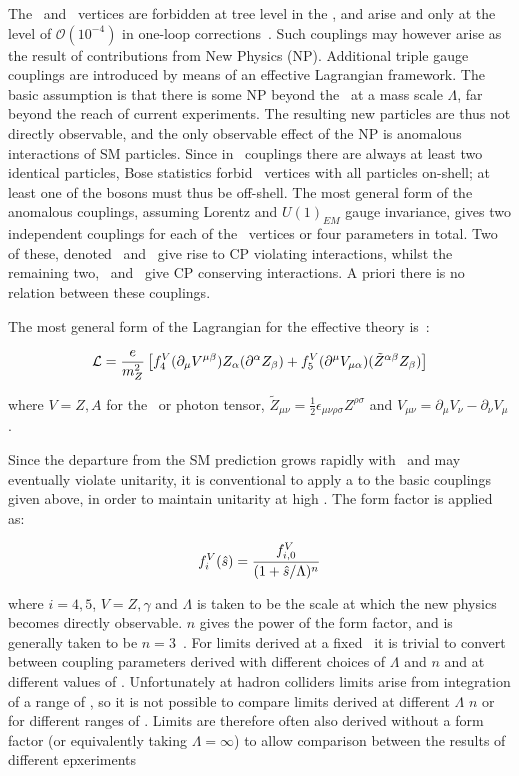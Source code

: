 The \ZZZ\ and \ZZg\ vertices are forbidden at tree level
in the \sm, and arise 
and only
at the level of  $\mathcal{O}(10^{-4})$ in one-loop
corrections~\cite{Gounaris:2000dn}.
Such couplings may however arise as the result of contributions from New Physics (NP).
Additional triple gauge couplings are introduced by means of an effective
Lagrangian framework. The basic assumption is that there is some NP beyond the
\sm\ at a mass scale $\Lambda$, far beyond the reach of current experiments. The resulting
new particles are thus not directly observable, and the only observable effect
of the NP is anomalous interactions of SM particles. Since in \ZZV\ couplings
there are always at least two identical particles, Bose statistics forbid \ZZV\
vertices with all particles on-shell; at least one of the bosons must thus be
off-shell. The most general form of the anomalous couplings, assuming Lorentz
and $U(1)_{EM}$ gauge invariance, gives two independent couplings for each of
the \ZZV\ vertices or four parameters in total. Two of these, denoted
\ffourZ\ and \ffourg\ give rise to CP violating interactions, whilst the
remaining two, \ffiveZ\ and \ffiveg\ give CP conserving interactions. A priori
there is no relation between these couplings. 

The most general form of the Lagrangian for the effective theory is~\cite{Gounaris:1999kf}:

\begin{align}
\mathcal{L} = \frac{e}{m_{Z}^{2}} \left[ 
f_{4}^{V}(\partial_{\mu}V^{\mu\beta})Z_{\alpha}(\partial^{\alpha}Z_{\beta}) +
f_{5}^{V}(\partial^{\mu}V_{\mu\alpha})(\tilde{Z}^{\alpha\beta}Z_{\beta}) \right]
\end{align}

where $V=Z,A$ for the \Z\ or photon tensor, $\tilde{Z}_{\mu\nu} = \frac{1}{2}
\epsilon_{\mu\nu\rho\sigma}Z^{\rho\sigma}$ and $V_{\mu\nu} = \partial_{\mu}V_{\nu}
- \partial_{\nu}V_{\mu}$.

Since the departure from the SM prediction grows rapidly with \sqrtshat\ and may
eventually violate unitarity, it is conventional to apply a \intro{form
factor} to the basic couplings given above, in order to maintain unitarity at
high \sqrtshat. The form factor is applied as:

\begin{align}
f_{i}^{V}(\hat{s}) = \frac{f^{V}_{i,0}}{(1 + \hat{s} / \Lambda)^{n}}
\end{align}

where $i=4,5$, $V=Z,\gamma$ and $\Lambda$ is taken to be the scale at which the
new physics becomes directly observable. $n$ gives the power of the form factor,
and is generally taken to be $n=3$~\cite{Baur:2000ae}. For limits derived at a
fixed \shat\ it is trivial to convert between coupling parameters derived with
different choices of $\Lambda$ and $n$ and at different values of \shat. 
Unfortunately at hadron colliders limits arise
from integration of a range of \shat, so it is not possible to compare
limits derived at different $\Lambda$ $n$ or for different ranges of \shat. 
Limits are therefore often also derived
without a form factor (or equivalently taking $\Lambda = \infty$) to allow
comparison between the results of different epxeriments

